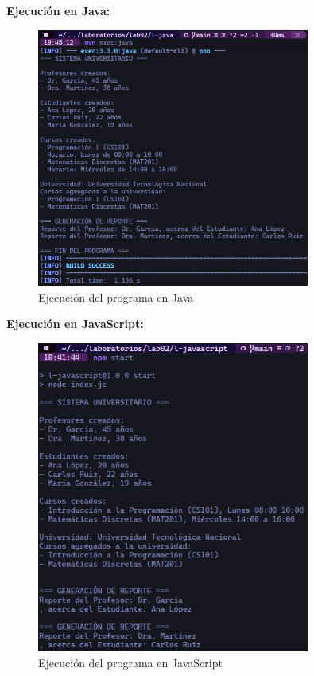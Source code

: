 \textbf{Ejecución en Java:}

\begin{figure}[H]
    \centering
    \includegraphics[width=0.8\textwidth]{img/prueba_ejecucion_java.png}
    \caption{Ejecución del programa en Java}
    \label{fig:ejecucion_java}
\end{figure}

\textbf{Ejecución en JavaScript:}

\begin{figure}[H]
    \centering
    \includegraphics[width=0.8\textwidth]{img/prueba_ejecucion_javascript.png}
    \caption{Ejecución del programa en JavaScript}
    \label{fig:ejecucion_javascript}
\end{figure}



